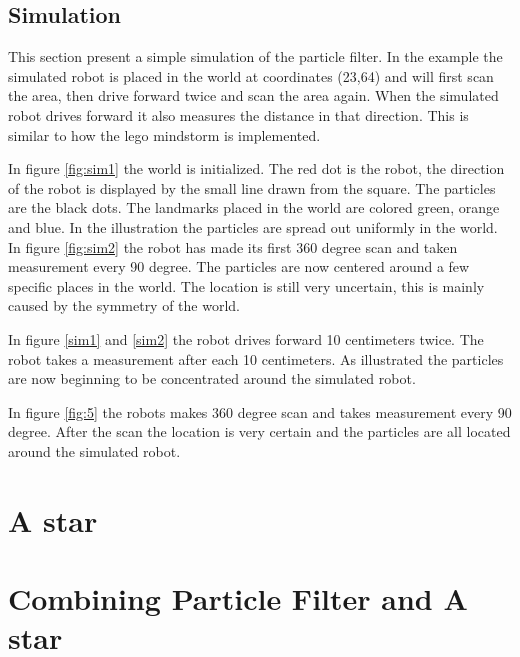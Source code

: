 \subsection{Simulation}
This section present a simple simulation of the particle filter. In the example the simulated robot is placed in the world at coordinates (23,64) and will first scan the area, then drive forward twice and scan the area again. When the simulated robot drives forward it also measures the distance in that direction. This is similar to how the lego mindstorm is implemented.

In figure \ref{fig:sim1} the world is initialized. The red dot is the robot, the direction of the robot is displayed by the small line drawn from the square. The particles are the black dots. The landmarks placed in the world are colored green, orange and blue. In the illustration the particles are spread out uniformly in the world. In figure \ref{fig:sim2} the robot has made its first 360 degree scan and taken measurement every 90 degree. The particles are now centered around a few specific places in the world. The location is still very uncertain, this is mainly caused by the symmetry of the world.


In figure \ref{sim1} and \ref{sim2} the robot drives forward 10 centimeters twice. The robot takes a measurement after each 10 centimeters. As illustrated the particles are now beginning to be concentrated around the simulated robot.


In figure \ref{fig:5} the robots makes 360 degree scan and takes measurement every 90 degree. After the scan the location is very certain and the particles are all located around the simulated robot.


\section{A star}


\section{Combining Particle Filter and A star}